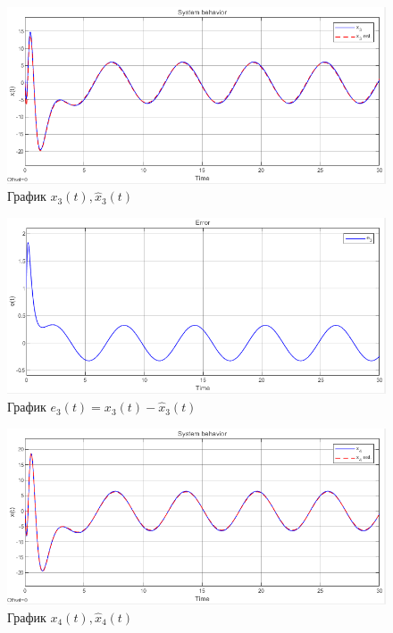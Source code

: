 \documentclass[a4paper, 12pt]{article}
\begin{document}
    \begin{figure}[H]
        \centering
        \includegraphics[scale=0.75]{3task_x3.png}
        \captionsetup{skip=0pt}
        \caption{График $x_3(t),\hat{x}_3(t)$}
        \label{fig:3task_x3}
    \end{figure}
    \begin{figure}[H]
        \centering
        \includegraphics[scale=0.75]{3task_e3.png}
        \captionsetup{skip=0pt}
        \caption{График $e_3(t)=x_3(t)-\hat{x}_3(t)$}
        \label{fig:3task_e3}
    \end{figure}
    \begin{figure}[H]
        \centering
        \includegraphics[scale=0.75]{3task_x4.png}
        \captionsetup{skip=0pt}
        \caption{График $x_4(t),\hat{x}_4(t)$}
        \label{fig:3task_x4}
    \end{figure}
\end{document}
